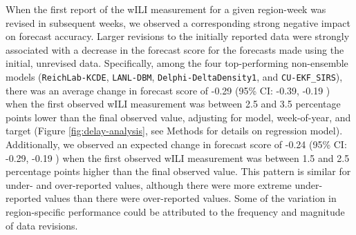 \documentclass[9pt,twocolumn,twoside]{pnas-new}\usepackage[]{graphicx}\usepackage[]{color}
\begin{document}
When the first report of the wILI measurement for a given region-week was revised in subsequent weeks, we observed a corresponding strong negative impact on forecast accuracy.
Larger revisions to the initially reported data were strongly associated with a decrease in the forecast score for the forecasts made using the initial, unrevised data.
Specifically, among the four top-performing non-ensemble models ({\tt ReichLab-KCDE}, {\tt LANL-DBM}, {\tt Delphi-DeltaDensity1}, and {\tt CU-EKF\_SIRS}), there was an average change in forecast score of -0.29 
(95\% CI: 
-0.39,
-0.19
)
when the first observed wILI measurement was between 2.5 and 3.5 percentage points lower than the final observed value, adjusting for model, week-of-year, and target (Figure \ref{fig:delay-analysis}, see Methods for details on regression model).
Additionally, we observed an expected change in forecast score of 
-0.24 
(95\% CI: 
-0.29,
-0.19
)
when the first observed wILI measurement was between 1.5 and 2.5 percentage points higher than the final observed value.
This pattern is similar for under- and over-reported values, although there were more extreme under-reported values than there were over-reported values. 
Some of the variation in region-specific performance could be attributed to the frequency and magnitude of data revisions.




% 
\end{document}
